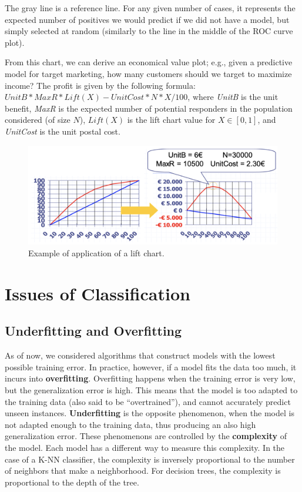 The gray line is a reference line. For any given number of cases, it represents the expected number of positives we would predict if we did not have a model, but simply selected at random (similarly to the line in the middle of the ROC curve plot).

From this chart, we can derive an economical value plot; e.g., given a predictive model for target marketing, how many customers should we target to maximize income? The profit is given by the following formula: $\textit{UnitB} * \textit{MaxR} * \textit{Lift}(X) - \textit{UnitCost}*N*X/100$, where \textit{UnitB} is the unit benefit, \textit{MaxR} is the expected number of potential responders in the population considered (of size $N$), $\textit{Lift}(X)$ is the lift chart value for $X \in [0,1]$, and \textit{UnitCost} is the unit postal cost.

\begin{figure}
    \centering
    \includegraphics[width=0.5\linewidth]{img/Lift chart application.png}
    \caption{Example of application of a lift chart.}
\end{figure}


\section{Issues of Classification}

\subsection{Underfitting and Overfitting}

As of now, we considered algorithms that construct models with the lowest possible training error. In practice, however, if a model fits the data too much, it incurs into \textbf{overfitting}. Overfitting happens when the training error is very low, but the generalization error is high. This means that the model is too adapted to the training data (also said to be ``overtrained''), and cannot accurately predict unseen instances. \textbf{Underfitting} is the opposite phenomenon, when the model is not adapted enough to the training data, thus producing an also high generalization error. These phenomenons are controlled by the \textbf{complexity} of the model. Each model has a different way to measure this complexity. In the case of a K-NN classifier, the complexity is inversely proportional to the number of neighbors that make a neighborhood. For decision trees, the complexity is proportional to the depth of the tree.

